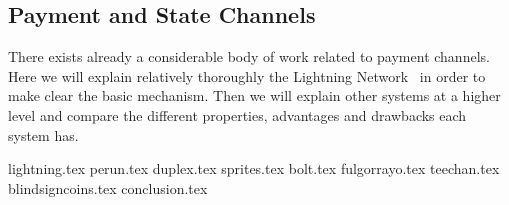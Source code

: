 \subsection{Payment and State Channels}
\label{sec:literaturereview:channels}
  There exists already a considerable body of work related to payment channels. Here we
  will explain relatively thoroughly the Lightning Network~\cite{lightning} in order to
  make clear the basic mechanism. Then we will explain other systems at a higher level and
  compare the different properties, advantages and drawbacks each system has.

  {lightning.tex}
  {perun.tex}
  {duplex.tex}
  {sprites.tex}
  {bolt.tex}
  {fulgorrayo.tex}
  {teechan.tex}
  {blindsigncoins.tex}
  {conclusion.tex}
